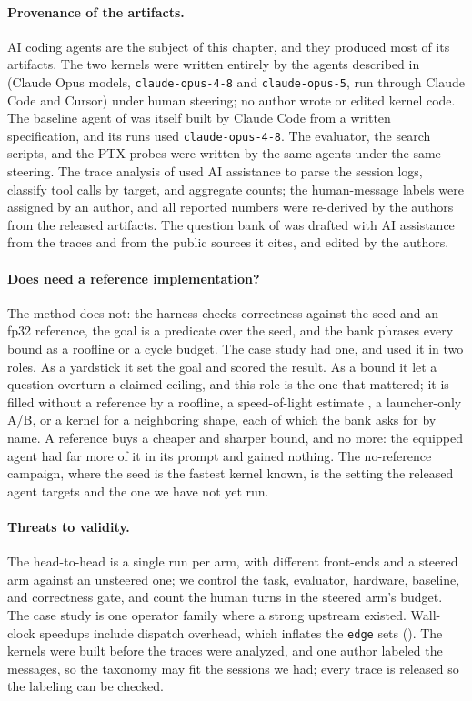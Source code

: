 \paragraph{Provenance of the artifacts.} AI coding agents are the subject of this chapter, and they
produced most of its artifacts. The two kernels were written entirely by the agents described in
 (Claude Opus models, \texttt{claude-opus-4-8} and
\texttt{claude-opus-5}, run through Claude Code and Cursor) under human steering; no author wrote or
edited kernel code. The baseline agent of  was itself built by Claude
Code from a written specification, and its runs used \texttt{claude-opus-4-8}. The evaluator, the
search scripts, and the PTX probes were written by the same agents under the same steering. The
trace analysis of  used AI assistance to parse the session logs, classify
tool calls by target, and aggregate counts; the human-message labels were assigned by an author,
and all reported numbers were re-derived by the authors from the released artifacts. The question
bank of  was drafted with AI assistance from the traces and from
the public sources it cites, and edited by the authors.

\paragraph{Does \KernelSeek need a reference implementation?} The method does not: the harness checks
correctness against the seed and an fp32 reference, the goal is a predicate over the seed, and the
bank phrases every bound as a roofline or a cycle budget. The case study had one, and used it in two
roles. As a yardstick it set the goal and scored the result. As a bound it let a question overturn a
claimed ceiling, and this role is the one that mattered; it is filled without a reference by a
roofline, a speed-of-light estimate \cite{solexecbench}, a launcher-only A/B, or a kernel for
a neighboring shape, each of which the bank asks for by name. A reference buys a cheaper and sharper
bound, and no more: the equipped agent had far more of it in its prompt and gained nothing. The
no-reference campaign, where the seed is the fastest kernel known, is the setting the released agent
targets and the one we have not yet run.

\paragraph{Threats to validity.} The head-to-head is a single run per arm, with different
front-ends and a steered arm against an unsteered one; we control the task, evaluator, hardware,
baseline, and correctness gate, and count the human turns in the steered arm's budget. The case
study is one operator family where a strong upstream existed. Wall-clock speedups include dispatch
overhead, which inflates the \texttt{edge} sets (). The kernels were built
before the traces were analyzed, and one author labeled the messages, so the taxonomy may fit the
sessions we had; every trace is released so the labeling can be checked.

